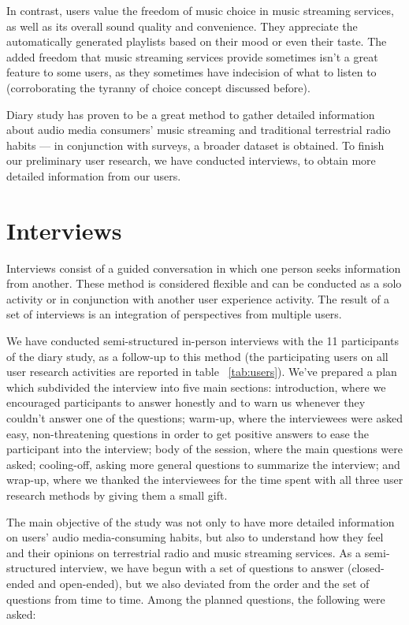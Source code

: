 In contrast, users value the freedom of music choice in music streaming services, as well as its overall sound quality and convenience. They appreciate the automatically generated playlists based on their mood or even their taste. The added freedom that music streaming services provide sometimes isn't a great feature to some users, as they sometimes have indecision of what to listen to (corroborating the tyranny of choice concept discussed before). 

Diary study has proven to be a great method to gather detailed information about audio media consumers' music streaming and traditional terrestrial radio habits — in conjunction with surveys, a broader dataset is obtained. To finish our preliminary user research, we have conducted interviews, to obtain more detailed information from our users.

\section{Interviews}

Interviews consist of a guided conversation in which one person seeks information from another. These method is considered flexible and can be conducted as a solo activity or in conjunction with another user experience activity. The result of a set of interviews is an integration of perspectives from multiple users. ~\cite{Courage2005}

We have conducted semi-structured in-person interviews with the 11 participants of the diary study, as a follow-up to this method (the participating users on all user research activities are reported in table ~\ref{tab:users}). We've prepared a plan which subdivided the interview into five main sections: introduction, where we encouraged participants to answer honestly and to warn us whenever they couldn't answer one of the questions; warm-up, where the interviewees were asked easy, non-threatening questions in order to get positive answers to ease the participant into the interview; body of the session, where the main questions were asked; cooling-off, asking more general questions to summarize the interview; and wrap-up, where we thanked the interviewees for the time spent with all three user research methods by giving them a small gift.

The main objective of the study was not only to have more detailed information on users' audio media-consuming habits, but also to understand how they feel and their opinions on terrestrial radio and music streaming services. As a semi-structured interview, we have begun with a set of questions to answer (closed-ended and open-ended), but we also deviated from the order and the set of questions from time to time. Among the planned questions, the following were asked:

